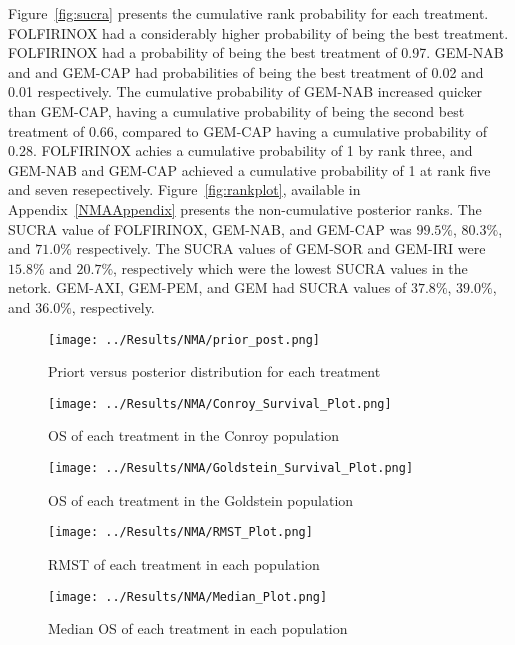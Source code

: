Figure~\ref{fig:sucra} presents the cumulative rank probability for each treatment. FOLFIRINOX had a considerably higher probability of being the best treatment. FOLFIRINOX had a probability of being the best treatment of 0.97. GEM-NAB and and GEM-CAP had probabilities of being the best treatment of 0.02 and 0.01 respectively. The cumulative probability of GEM-NAB increased quicker than GEM-CAP, having a cumulative probability of being the second best treatment of 0.66, compared to GEM-CAP having a cumulative probability of $0.28$. FOLFIRINOX achies a cumulative probability of 1 by rank three, and GEM-NAB and GEM-CAP achieved a cumulative probability of 1 at rank five and seven resepectively. Figure~\ref{fig:rankplot}, available in Appendix~\ref{NMAAppendix} presents the non-cumulative posterior ranks. The SUCRA value of FOLFIRINOX, GEM-NAB, and GEM-CAP was $99.5\%$, $80.3\%$, and $71.0\%$ respectively. The SUCRA values of GEM-SOR and GEM-IRI were $15.8\%$ and $20.7\%$, respectively which were the lowest SUCRA values in the netork. GEM-AXI, GEM-PEM, and GEM had SUCRA values of $37.8\%$, $39.0\%$, and $36.0\%$, respectively. 

\begin{figure}[h]
    \centering
    \texttt{[image: ../Results/NMA/prior\_post.png]}
    \caption{Priort versus posterior distribution for each treatment}
    \label{fig:prior_post}
\end{figure}


\begin{figure}[h]
    \centering
    \texttt{[image: ../Results/NMA/Conroy\_Survival\_Plot.png]}
    \caption{OS of each treatment in the Conroy population}
    \label{fig:pred_survbc_conroy}
\end{figure}

\begin{figure}[h]
    \centering
    \texttt{[image: ../Results/NMA/Goldstein\_Survival\_Plot.png]}
    \caption{OS of each treatment in the Goldstein population}
    \label{fig:pred_survbc_goldstein}
\end{figure}

\begin{figure}[h]
    \centering
    \texttt{[image: ../Results/NMA/RMST\_Plot.png]}
    \caption{RMST of each treatment in each population}
    \label{fig:pred_rmstbc}
\end{figure}

\begin{figure}[h]
    \centering
    \texttt{[image: ../Results/NMA/Median\_Plot.png]}
    \caption{Median OS of each treatment in each population}
    \label{fig:pred_medianbc}
\end{figure}


